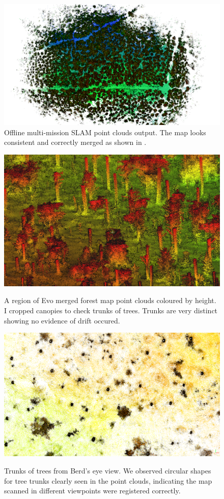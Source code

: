 \begin{figure}[htbp]
  \centering
  \includegraphics[width=0.99\columnwidth]{pics/exp_3_offline_fullmap_portrait.png}
  \caption{Offline multi-mission SLAM point clouds output. The map looks consistent and correctly merged as shown in .}
  \label{fig:exp_offline_clouds}
\end{figure}

\begin{figure}[htbp]
  \centering
  \includegraphics[width=0.99\columnwidth]{pics/exp_3_offline_pointclouds_trunk.png}\label{fig:truk of trees}
  \caption{A region of Evo merged forest map point clouds coloured by height. I cropped canopies to check trunks of trees. Trunks are very distinct showing no evidence of drift occured.}
  \includegraphics[width=0.99\columnwidth]{pics/exp_3_offline_pointclouds_trunk_BV3.png}\label{fig:trunk of trees BV}
  \caption{Trunks of trees from Berd's eye view. We observed circular shapes for tree trunks clearly seen in the point clouds, indicating the map scanned in different viewpoints were registered correctly.}
\end{figure}
